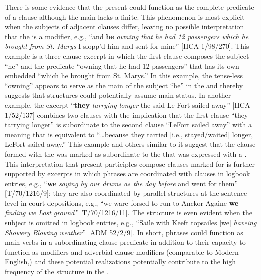There is some evidence that the present  could function as the complete predicate of a clause although the main  lacks a finite. This phenomenon is most explicit when the subjects of adjacent clauses differ, leaving no possible interpretation that the  is a modifier, e.g., “and \textbf{he} \textit{owning that he had 12 passengers which he brought from St. Marys} I slopp’d him and sent for mine” [HCA 1/98/270]. This example is a three-clause excerpt in which the first clause composes the subject “he” and the predicate “owning that he had 12 passengers” that has its own embedded  “which he brought from St. Marys.” In this example, the tense-less  “owning” appears to serve as the main  of the subject “he” in the  and thereby suggests that  structures could potentially assume main  status. In another example, the excerpt “\textbf{they} \textit{tarrying longer} the said Le Fort sailed away” [HCA 1/52/137] combines two clauses with the implication that the first clause “they tarrying longer” is subordinate to the second clause “LeFort sailed away” with a meaning that is equivalent to “…because they tarried [i.e., stayed/waited] longer, LeFort sailed away.” This example and others similar to it suggest that the clause formed with the  was marked as subordinate to the  that was expressed with a . This interpretation that present participles compose clauses marked for  is further supported by excerpts in which  phrases are coordinated with clauses in logbook entries, e.g., “\textbf{we} \textit{saying by our drums as the day before} and went for them” [T/70/1216/9]; they are also coordinated by parallel structures at the sentence level in court depositions, e.g., “we ware forsed to run to Anckor Againe \textbf{we} \textit{finding we Lost ground”} [T/70/1216/11]. The structure is even evident when the  subject is omitted in logbook entries, e.g., “Saile with Keeft topsailes [we] \textit{haveing Showery Blowing weather}” [ADM 52/2/9]. In short,  phrases could function as main verbs in a subordinating clause predicate in addition to their capacity to function as   modifiers and adverbial clause modifiers (comparable to Modern English,) and these potential realizations potentially contribute to the high frequency of the structure in the . 

